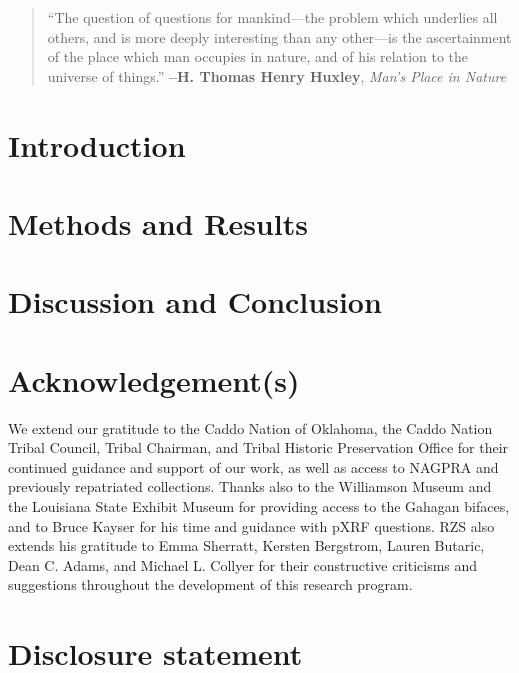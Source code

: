 \documentclass[]{interact}
\theoremstyle{plain}%
\theoremstyle{definition}
\theoremstyle{remark}
\begin{document}
\begin{quote}
``The question of questions for mankind---the problem which underlies
all others, and is more deeply interesting than any other---is the
ascertainment of the place which man occupies in nature, and of his
relation to the universe of things.'' \textbf{--H. Thomas Henry Huxley},
\emph{Man's Place in Nature}
\end{quote}

\hypertarget{introduction}{%
\section{Introduction}\label{introduction}}

\hypertarget{methods-and-results}{%
\section{Methods and Results}\label{methods-and-results}}

\hypertarget{discussion-and-conclusion}{%
\section{Discussion and Conclusion}\label{discussion-and-conclusion}}

\hypertarget{acknowledgements}{%
\section*{Acknowledgement(s)}\label{acknowledgements}}

We extend our gratitude to the Caddo Nation of Oklahoma, the Caddo
Nation Tribal Council, Tribal Chairman, and Tribal Historic Preservation
Office for their continued guidance and support of our work, as well as
access to NAGPRA and previously repatriated collections. Thanks also to
the Williamson Museum and the Louisiana State Exhibit Museum for
providing access to the Gahagan bifaces, and to Bruce Kayser for his
time and guidance with pXRF questions. RZS also extends his gratitude to
Emma Sherratt, Kersten Bergstrom, Lauren Butaric, Dean C. Adams, and
Michael L. Collyer for their constructive criticisms and suggestions
throughout the development of this research program.

\hypertarget{disclosure-statement}{%
\section*{Disclosure statement}\label{disclosure-statement}}
\end{document}

